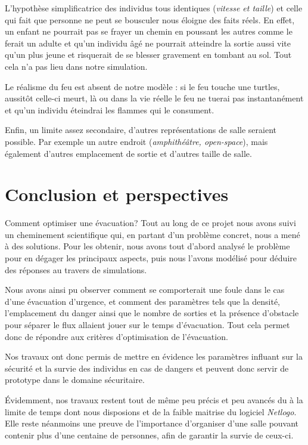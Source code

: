 \documentclass{article}
\begin{document}
L’hypothèse simplificatrice des individus tous identiques ({\em vitesse et taille}) et celle qui fait que personne ne peut se bousculer nous éloigne des faits réels. En effet, un enfant ne pourrait pas se frayer un chemin en poussant les autres comme le ferait un adulte et qu’un individu âgé ne pourrait atteindre la sortie aussi vite qu’un plus jeune et risquerait de se blesser gravement en tombant au sol. Tout cela n’a pas lieu dans notre simulation. 

Le réalisme du feu est absent de notre modèle : si le feu touche une turtles, aussitôt celle-ci meurt, là ou dans la vie réelle le feu ne tuerai pas instantanément et qu’un individu éteindrai les flammes qui le consument.

Enfin, un limite assez secondaire, d'autres représentations de salle seraient possible. Par exemple un autre endroit ({\em amphithéâtre, open-space}), mais également d’autres emplacement de sortie et d’autres taille de salle. 

\section*{Conclusion et perspectives} 

Comment optimiser une évacuation?
Tout au long de ce projet nous avons suivi un cheminement scientifique qui, en partant d'un problème concret, nous a mené à des solutions.
Pour les obtenir, nous avons tout d'abord analysé le problème pour en dégager les principaux aspects, puis nous l'avons modélisé pour déduire des réponses au travers de simulations.

Nous avons ainsi pu observer comment se comporterait une foule dans le cas d'une évacuation d'urgence, et comment des paramètres tels que la densité, l'emplacement du danger ainsi que le nombre de sorties et la présence d'obstacle pour séparer le flux allaient jouer sur le temps d'évacuation. Tout cela permet donc de répondre aux critères d'optimisation de l'évacuation.

Nos travaux ont donc permis de mettre en évidence les paramètres influant sur la sécurité et la survie des individus en cas de dangers et peuvent donc servir de prototype dans le domaine sécuritaire.

Évidemment, nos travaux restent tout de même peu précis et peu avancés du à la limite de temps dont nous disposions et de la faible maitrise du logiciel {\it Netlogo}. Elle reste néanmoins une preuve de l'importance d'organiser d'une salle pouvant contenir plus d'une centaine de personnes, afin de garantir la survie de ceux-ci.



\end{document}
